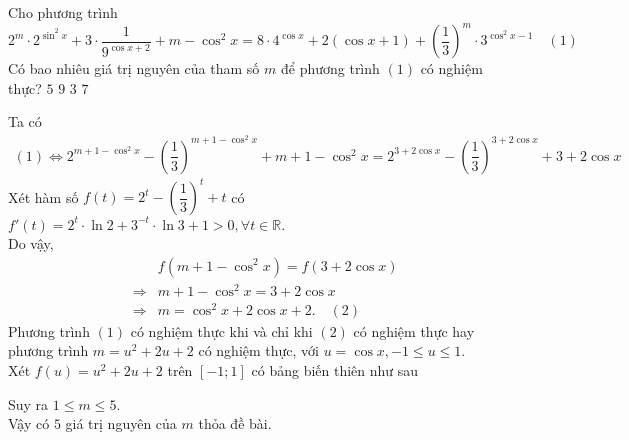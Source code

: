 \begin{ex}%
Cho phương trình $$ 2^m \cdot 2^{\sin^2 x} + 3 \cdot \dfrac{1}{9^{\cos x + 2}} + m - \cos^2 x = 8 \cdot 4^{\cos x} + 2\left(\cos x + 1\right) + \left(\dfrac{1}{3}\right)^m \cdot 3^{\cos^2 x- 1} \quad (1)$$ Có bao nhiêu giá trị nguyên của tham số $ m $ để phương trình $ (1) $ có nghiệm thực?
	\choice
	{\True $ 5 $}
	{$ 9 $}
	{$ 3 $}
	{$ 7 $}
	\loigiai
	{
Ta có \begin{eqnarray*}
(1) \Leftrightarrow 2^{m+1-\cos^2 x} - \left(\dfrac{1}{3}\right)^{m+1-\cos^2 x} + m + 1 -\cos^2 x = 2^{3+2\cos x} - \left(\dfrac{1}{3}\right)^{3+2\cos x} + 3 + 2\cos x
\end{eqnarray*}  
Xét hàm số $ f(t) = 2^t - \left(\dfrac{1}{3}\right)^t + t $ có $ f'(t) = 2^t \cdot \ln 2 +3^{-t} \cdot \ln 3 + 1 > 0, \forall t \in \mathbb{R}. $\\
Do vậy, \begin{eqnarray*}
&& f\left(m+1-\cos^2 x\right) = f\left(3+2\cos x\right)\\ & \Rightarrow & m+1-\cos^2 x = 3 + 2\cos x \\ &\Rightarrow&  m = \cos^2x + 2\cos x + 2. \quad (2)
\end{eqnarray*}
Phương trình $ (1) $ có nghiệm thực khi và chỉ khi $ (2) $ có nghiệm thực hay phương trình $ m = u^2 + 2u + 2 $ có nghiệm thực, với $ u = \cos x , -1 \le u \le 1$. \\
Xét $ f(u) = u^2 + 2u + 2 $ trên $ \left[-1;1\right] $ có bảng biến thiên như sau
\begin{center}
\end{center}
Suy ra $ 1 \le m \le 5. $\\
Vậy có $ 5 $ giá trị nguyên của $ m $ thỏa đề bài.
}
\end{ex}
